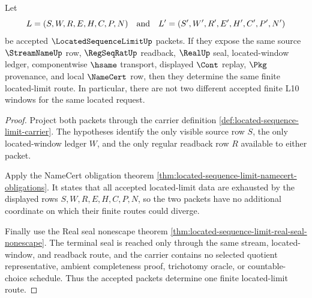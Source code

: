 \begin{theorem}
\label{thm:located-sequence-limit-window-uniqueness}
Let
$$
L=(S,W,R,E,H,C,P,N)
\quad\hbox{and}\quad
L'=(S',W',R',E',H',C',P',N')
$$
be accepted $\LocatedSequenceLimitUp$ packets. If they expose the same source $\StreamNameUp$ row, $\RegSeqRatUp$ readback, $\RealUp$ seal, located-window ledger, componentwise $\hsame$ transport, displayed $\Cont$ replay, $\Pkg$ provenance, and local $\NameCert$ row, then they determine the same finite located-limit route. In particular, there are not two different accepted finite L10 windows for the same located request.
\end{theorem}
\begin{proof}
Project both packets through the carrier definition \autoref{def:located-sequence-limit-carrier}. The hypotheses identify the only visible source row $S$, the only located-window ledger $W$, and the only regular readback row $R$ available to either packet.

Apply the NameCert obligation theorem \autoref{thm:located-sequence-limit-namecert-obligations}. It states that all accepted located-limit data are exhausted by the displayed rows $S,W,R,E,H,C,P,N$, so the two packets have no additional coordinate on which their finite routes could diverge.

Finally use the Real seal nonescape theorem \autoref{thm:located-sequence-limit-real-seal-nonescape}. The terminal seal is reached only through the same stream, located-window, and readback route, and the carrier contains no selected quotient representative, ambient completeness proof, trichotomy oracle, or countable-choice schedule. Thus the accepted packets determine one finite located-limit route.
\end{proof}


\begin{closurestatus}{\LocatedSequenceLimitUp}
  \theoryclosure{\seedClosure}
  \formalstatus{\unformalizedV}
\end{closurestatus}
